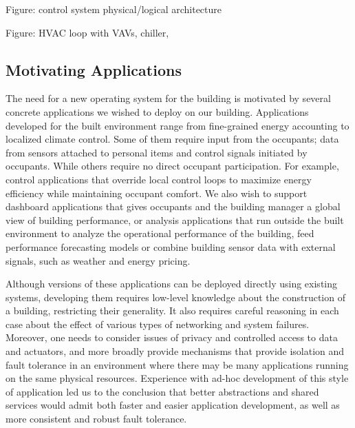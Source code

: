 Figure: control system physical/logical architecture

Figure: HVAC loop with VAVs, chiller, 


%

\subsection{Motivating Applications}

The need for a new operating system for the building is motivated by several concrete applications we wished to deploy on our building.  Applications developed for the built environment range from fine-grained energy accounting to localized climate control.  Some of them require input from the occupants; data from sensors attached to personal items and control signals initiated by occupants.  While others require no direct occupant participation.  For example, control applications that override local control loops to maximize energy efficiency while maintaining occupant comfort.  We also wish to support dashboard applications that gives occupants and the building manager a global view of building performance, or analysis applications that run outside the built environment to analyze the operational performance of the building, feed performance forecasting models or combine building sensor data with external signals, such as weather and energy pricing.

Although versions of these applications can be deployed directly using existing systems, developing them requires low-level knowledge about the construction of a building, restricting their generality. It also requires careful reasoning in each case about the effect of various types of networking and system failures.  Moreover, one needs to consider issues of privacy and controlled access to data and actuators, and more broadly provide mechanisms that provide isolation and fault tolerance in an environment where there may be many applications running on the same physical resources. Experience with ad-hoc development of this style of application led us to the conclusion that better abstractions and shared services would admit both faster and easier application development, as well as more consistent and robust fault tolerance.

